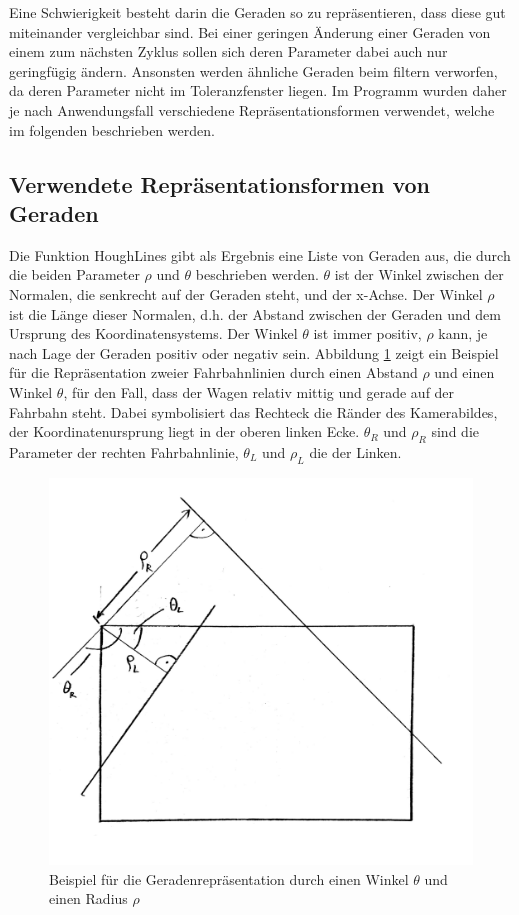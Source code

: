 	Eine Schwierigkeit besteht darin die Geraden so zu repräsentieren, dass diese gut miteinander vergleichbar sind. Bei einer geringen Änderung einer Geraden von einem zum nächsten Zyklus sollen sich deren Parameter dabei auch nur geringfügig ändern. Ansonsten werden ähnliche Geraden beim filtern verworfen, da deren Parameter nicht im Toleranzfenster liegen. Im Programm wurden daher je nach Anwendungsfall verschiedene Repräsentationsformen verwendet, welche im folgenden beschrieben werden.
	
	\subsection{Verwendete Repräsentationsformen von Geraden}
	
	Die Funktion HoughLines gibt als Ergebnis eine Liste von Geraden aus, die durch die beiden Parameter $\rho$ und $\theta$ beschrieben werden. $\theta$ ist der Winkel zwischen der Normalen, die senkrecht auf der Geraden steht, und der x-Achse. Der Winkel  $\rho$ ist die Länge dieser Normalen, d.h. der Abstand zwischen der Geraden und dem Ursprung des Koordinatensystems. Der Winkel $\theta$ ist immer positiv, $\rho$ kann, je nach Lage der Geraden positiv oder negativ sein.
	Abbildung \ref{fig:rho_theta1} zeigt ein Beispiel für die Repräsentation zweier Fahrbahnlinien durch einen Abstand $\rho$ und einen Winkel $\theta$, für den Fall, dass der Wagen relativ mittig und gerade auf der Fahrbahn steht. Dabei symbolisiert das Rechteck die Ränder des Kamerabildes, der Koordinatenursprung liegt in der oberen linken Ecke. $\theta_R$ und $\rho_R$ sind die Parameter der rechten Fahrbahnlinie, $\theta_L$ und $\rho_L$ die der Linken.
	
	\begin{figure}[H]
		\centering
		\includegraphics[width=.5\linewidth]{images/rho_theta1.jpg}
		\caption{Beispiel für die Geradenrepräsentation durch einen Winkel $\theta$ und einen Radius $\rho$}
		\label{fig:rho_theta1}
	\end{figure}
	
